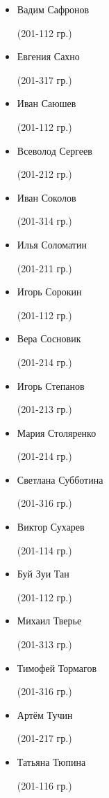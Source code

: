 \begin{multicols}{2}
\begin{small}
\begin{itemize}[leftmargin=0.5em]
	\item[] Вадим Сафронов\begin{tiny} (201-112 гр.)\end{tiny}
	\item[] Евгения Сахно\begin{tiny} (201-317 гр.)\end{tiny} %
	\item[] Иван Саюшев\begin{tiny} (201-112 гр.)\end{tiny}
	\item[] Всеволод Сергеев\begin{tiny} (201-212 гр.)\end{tiny} %
	\item[] Иван Соколов\begin{tiny} (201-314 гр.)\end{tiny} %
	\item[] Илья Соломатин\begin{tiny} (201-211 гр.)\end{tiny}
	\item[] Игорь Сорокин\begin{tiny} (201-112 гр.)\end{tiny}
	\item[] Вера Сосновик\begin{tiny} (201-214 гр.)\end{tiny} %
	\item[] Игорь Степанов\begin{tiny} (201-213 гр.)\end{tiny}
	\item[] Мария Столяренко\begin{tiny} (201-214 гр.)\end{tiny}
	\item[] Светлана Субботина\begin{tiny} (201-316 гр.)\end{tiny} %
	\item[] Виктор Сухарев\begin{tiny} (201-114 гр.)\end{tiny} %

	\item[] Буй Зуи Тан\begin{tiny} (201-112 гр.)\end{tiny}
	\item[] Михаил Тверье\begin{tiny} (201-313 гр.)\end{tiny} %
	\item[] Тимофей Тормагов\begin{tiny} (201-316 гр.)\end{tiny} %
	\item[] Артём Тучин\begin{tiny} (201-217 гр.)\end{tiny} %
	\item[] Татьяна Тюпина\begin{tiny} (201-116 гр.)\end{tiny}


\end{itemize}
\end{small}
\end{multicols}
